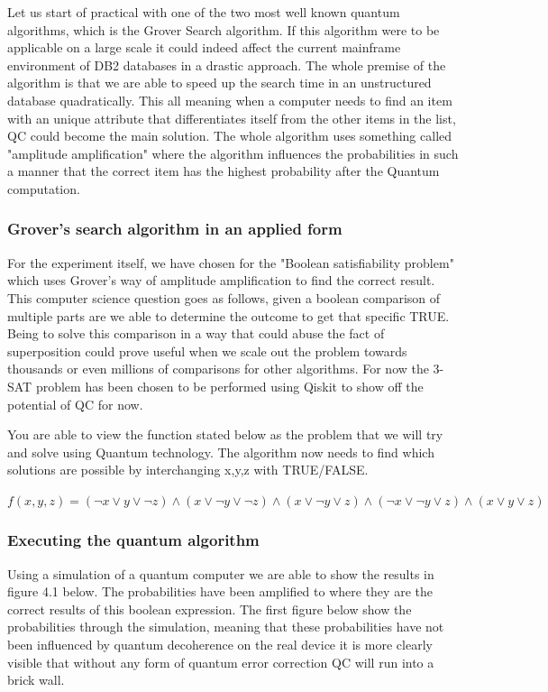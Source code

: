 Let us start of practical with one of the two most well known quantum algorithms, which is the Grover Search algorithm. If this algorithm were to be applicable on a large scale it could indeed affect the current mainframe environment of DB2 databases in a drastic approach. The whole premise of the algorithm is that we are able to speed up the search time in an unstructured database quadratically. This all meaning when a computer needs to find an item with an unique attribute that differentiates itself from the other items in the list, QC could become the main solution. The whole algorithm uses something called "amplitude amplification" where the algorithm influences the probabilities in such a manner that the correct item has the highest probability after the Quantum computation. \autocite{Grover1996}

\subsubsection{Grover's search algorithm in an applied form}

For the experiment itself, we have chosen for the "Boolean satisfiability problem" which uses Grover's way of amplitude amplification to find the correct result. This computer science question goes as follows, given a boolean comparison of multiple parts are we able to determine the outcome to get that specific TRUE. Being to solve this comparison in a way that could abuse the fact of superposition could prove useful when we scale out the problem towards thousands or even millions of comparisons for other algorithms. For now the 3-SAT problem has been chosen to be performed using Qiskit to show off the potential of QC for now.

You are able to view the function stated below as the problem that we will try and solve using Quantum technology. The algorithm now needs to find which solutions are possible by interchanging x,y,z with TRUE/FALSE.

$ f(x,y,z) = (\neg x \vee y \vee \neg z) \wedge  ( x \vee \neg y \vee \neg z) \wedge ( x \vee \neg y \vee  z) \wedge (\neg x \vee \neg y \vee z) \wedge  ( x \vee y \vee  z)	 $
				 
\subsubsection{Executing the quantum algorithm}				 

Using a simulation of a quantum computer we are able to show the results in figure 4.1 below. The probabilities have been amplified to where they are the correct results of this boolean expression. The first figure below show the probabilities through the simulation, meaning that these probabilities have not been influenced by quantum decoherence on the real device it is more clearly visible that without any form of quantum error correction QC will run into a brick wall. 

